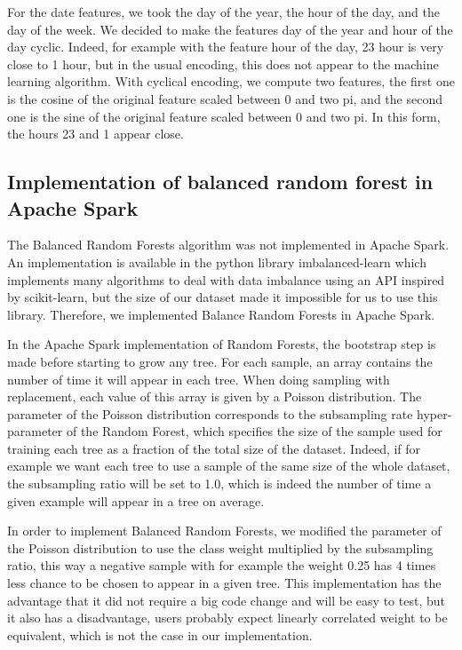 \documentclass[conference]{IEEEtran}
\begin{document}
For the date features, we took the day of the year, the hour of the day, and the day of the week. We decided to make the features day of the year and hour of the day cyclic. Indeed, for example with the feature hour of the day, 23 hour is very close to 1 hour, but in the usual encoding, this does not appear to the machine learning algorithm. With cyclical encoding, we compute two features, the first one is the cosine of the original feature scaled between 0 and two pi, and the second one is the sine of the original feature scaled between 0 and two pi. In this form, the hours 23 and 1 appear close.

\subsection{Implementation of balanced random forest in Apache Spark}
The Balanced Random Forests algorithm was not implemented in Apache Spark. An implementation is available in the python library imbalanced-learn\cite{imbalance} which implements many algorithms to deal with data imbalance using an API inspired by scikit-learn, but the size of our dataset made it impossible for us to use this library. Therefore, we implemented Balance Random Forests in Apache Spark. 

In the Apache Spark implementation of Random Forests, the bootstrap step is made before starting to grow any tree. For each sample, an array contains the number of time it will appear in each tree. When doing sampling with replacement, each value of this array is given by a Poisson distribution. The parameter of the Poisson distribution corresponds to the subsampling rate hyper-parameter of the Random Forest, which specifies the size of the sample used for training each tree as a fraction of the total size of the dataset. Indeed, if for example we want each tree to use a sample of the same size of the whole dataset, the subsampling ratio will be set to 1.0, which is indeed the number of time a given example will appear in a tree on average. 

In order to implement Balanced Random Forests, we modified the parameter of the Poisson distribution to use the class weight multiplied by the subsampling ratio, this way a negative sample with for example the weight 0.25 has 4 times less chance to be chosen to appear in a given tree. This implementation has the advantage that it did not require a big code change and will be easy to test, but it also has a disadvantage, users probably expect linearly correlated weight to be equivalent, which is not the case in our implementation.
	
\end{document}
